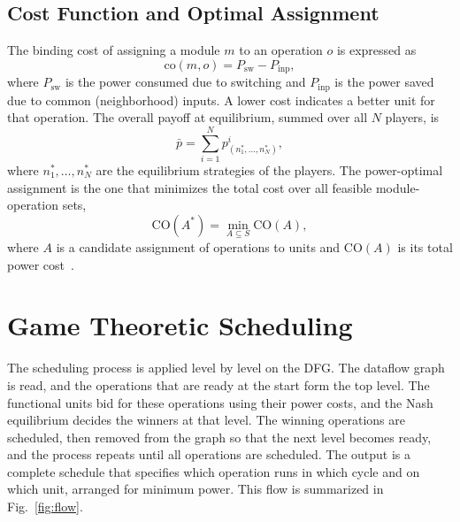 \documentclass[conference]{IEEEtran}
\begin{document}
\subsection{Cost Function and Optimal Assignment}
The binding cost of assigning a module $m$ to an operation $o$ is
expressed as
\begin{equation}
\mathrm{co}(m,o) = P_{\mathrm{sw}} - P_{\mathrm{inp}},
\end{equation}
where $P_{\mathrm{sw}}$ is the power consumed due to switching and
$P_{\mathrm{inp}}$ is the power saved due to common (neighborhood)
inputs. A lower cost indicates a better unit for that operation. The
overall payoff at equilibrium, summed over all $N$ players, is
\begin{equation}
\bar{p} = \sum_{i=1}^{N} p^{i}_{(n^{*}_{1},\dots,n^{*}_{N})},
\end{equation}
where $n^{*}_{1},\dots,n^{*}_{N}$ are the equilibrium strategies of the
players. The power-optimal assignment is the one that minimizes the
total cost over all feasible module-operation sets,
\begin{equation}
\mathrm{CO}(A^{*}) = \min_{A \subseteq S} \mathrm{CO}(A),
\end{equation}
where $A$ is a candidate assignment of operations to units and
$\mathrm{CO}(A)$ is its total power cost~\cite{murugavel2003}.

\section{Game Theoretic Scheduling}

The scheduling process is applied level by level on the DFG. The
dataflow graph is read, and the operations that are ready at the start
form the top level. The functional units bid for these operations using
their power costs, and the Nash equilibrium decides the winners at that
level. The winning operations are scheduled, then removed from the
graph so that the next level becomes ready, and the process repeats
until all operations are scheduled. The output is a complete schedule
that specifies which operation runs in which cycle and on which unit,
arranged for minimum power. This flow is summarized in
Fig.~\ref{fig:flow}.
\end{document}

